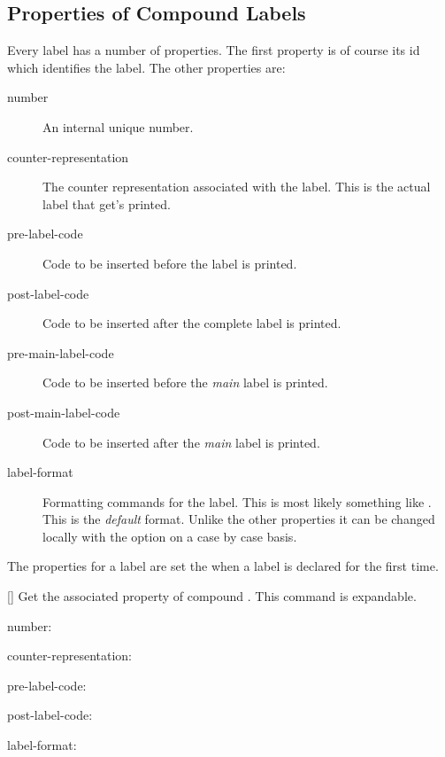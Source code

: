 \documentclass[load-preamble+,ngerman,british,american]{cnltx-doc}
\begin{document}
\subsection{Properties of Compound Labels}\label{sec:prop-comp-labels}

Every label has a number of properties.  The first property is of course its
\ac{id} which identifies the label.  The other properties are:
\begin{description}
  \item[number] An internal unique number.
  \item[counter-representation] The counter representation associated with the
    label.  This is the actual label that get's printed.
  \item[pre-label-code] Code to be inserted before the label is printed.
  \item[post-label-code] Code to be inserted after the complete label is
    printed.
  \item[pre-main-label-code] Code to be inserted before the \emph{main} label
    is printed.
  \item[post-main-label-code] Code to be inserted after the \emph{main} label
    is printed.
  \item[label-format] Formatting commands for the label.  This is most likely
    something like .  This is the \emph{default} format.  Unlike
    the other properties it can be changed locally with the 
    option on a case by case basis.
\end{description}

The properties for a label are set the when a label is declared for the first
time.

\begin{commands}
  \expandable{}[]
    Get the associated property  of compound .  This
    command is expandable.
\end{commands}

\begin{example}
  \def\expandfull{\romannumeral-`0}%
  \def\expandtwice{\detokenize\expandafter\expandafter\expandafter}%
  \ttfamily
  number: \par
  counter-representation: \par
  pre-label-code: \par %
  post-label-code: \par %
  label-format: \expandtwice{\expandfull\cmpdproperty{benzene}{label-format}}
\end{example}
\end{document}
